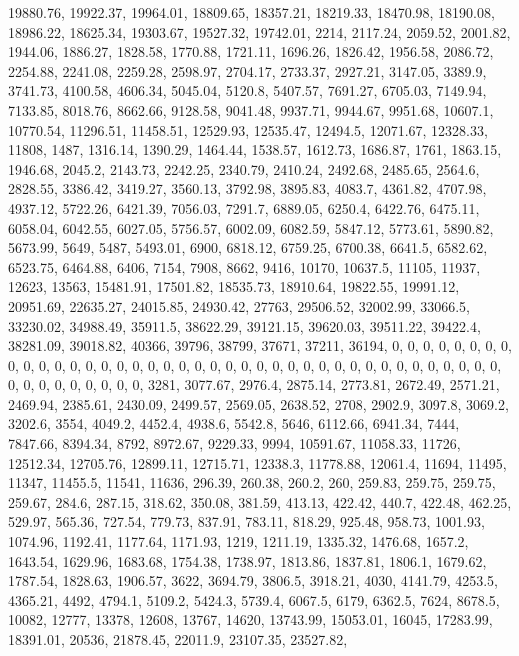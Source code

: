 \documentclass[
]{article}
\begin{document}
19880.76, 19922.37, 19964.01, 18809.65, 18357.21, 18219.33, 18470.98,
18190.08, 18986.22, 18625.34, 19303.67, 19527.32, 19742.01, 2214,
2117.24, 2059.52, 2001.82, 1944.06, 1886.27, 1828.58, 1770.88, 1721.11,
1696.26, 1826.42, 1956.58, 2086.72, 2254.88, 2241.08, 2259.28, 2598.97,
2704.17, 2733.37, 2927.21, 3147.05, 3389.9, 3741.73, 4100.58, 4606.34,
5045.04, 5120.8, 5407.57, 7691.27, 6705.03, 7149.94, 7133.85, 8018.76,
8662.66, 9128.58, 9041.48, 9937.71, 9944.67, 9951.68, 10607.1, 10770.54,
11296.51, 11458.51, 12529.93, 12535.47, 12494.5, 12071.67, 12328.33,
11808, 1487, 1316.14, 1390.29, 1464.44, 1538.57, 1612.73, 1686.87, 1761,
1863.15, 1946.68, 2045.2, 2143.73, 2242.25, 2340.79, 2410.24, 2492.68,
2485.65, 2564.6, 2828.55, 3386.42, 3419.27, 3560.13, 3792.98, 3895.83,
4083.7, 4361.82, 4707.98, 4937.12, 5722.26, 6421.39, 7056.03, 7291.7,
6889.05, 6250.4, 6422.76, 6475.11, 6058.04, 6042.55, 6027.05, 5756.57,
6002.09, 6082.59, 5847.12, 5773.61, 5890.82, 5673.99, 5649, 5487,
5493.01, 6900, 6818.12, 6759.25, 6700.38, 6641.5, 6582.62, 6523.75,
6464.88, 6406, 7154, 7908, 8662, 9416, 10170, 10637.5, 11105, 11937,
12623, 13563, 15481.91, 17501.82, 18535.73, 18910.64, 19822.55,
19991.12, 20951.69, 22635.27, 24015.85, 24930.42, 27763, 29506.52,
32002.99, 33066.5, 33230.02, 34988.49, 35911.5, 38622.29, 39121.15,
39620.03, 39511.22, 39422.4, 38281.09, 39018.82, 40366, 39796, 38799,
37671, 37211, 36194, 0, 0, 0, 0, 0, 0, 0, 0, 0, 0, 0, 0, 0, 0, 0, 0, 0,
0, 0, 0, 0, 0, 0, 0, 0, 0, 0, 0, 0, 0, 0, 0, 0, 0, 0, 0, 0, 0, 0, 0, 0,
0, 0, 0, 0, 0, 0, 0, 0, 3281, 3077.67, 2976.4, 2875.14, 2773.81,
2672.49, 2571.21, 2469.94, 2385.61, 2430.09, 2499.57, 2569.05, 2638.52,
2708, 2902.9, 3097.8, 3069.2, 3202.6, 3554, 4049.2, 4452.4, 4938.6,
5542.8, 5646, 6112.66, 6941.34, 7444, 7847.66, 8394.34, 8792, 8972.67,
9229.33, 9994, 10591.67, 11058.33, 11726, 12512.34, 12705.76, 12899.11,
12715.71, 12338.3, 11778.88, 12061.4, 11694, 11495, 11347, 11455.5,
11541, 11636, 296.39, 260.38, 260.2, 260, 259.83, 259.75, 259.75,
259.67, 284.6, 287.15, 318.62, 350.08, 381.59, 413.13, 422.42, 440.7,
422.48, 462.25, 529.97, 565.36, 727.54, 779.73, 837.91, 783.11, 818.29,
925.48, 958.73, 1001.93, 1074.96, 1192.41, 1177.64, 1171.93, 1219,
1211.19, 1335.32, 1476.68, 1657.2, 1643.54, 1629.96, 1683.68, 1754.38,
1738.97, 1813.86, 1837.81, 1806.1, 1679.62, 1787.54, 1828.63, 1906.57,
3622, 3694.79, 3806.5, 3918.21, 4030, 4141.79, 4253.5, 4365.21, 4492,
4794.1, 5109.2, 5424.3, 5739.4, 6067.5, 6179, 6362.5, 7624, 8678.5,
10082, 12777, 13378, 12608, 13767, 14620, 13743.99, 15053.01, 16045,
17283.99, 18391.01, 20536, 21878.45, 22011.9, 23107.35, 23527.82,
\end{document}
